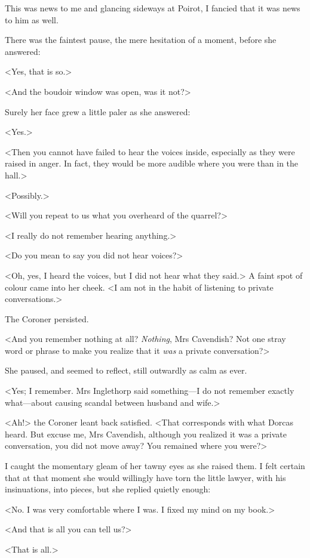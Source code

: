  This was news to me and glancing sideways at Poirot, I fancied that it was news to him as well. 

 There was the faintest pause, the mere hesitation of a moment, before she answered: 

 <Yes, that is so.> 

 <And the boudoir window was open, was it not?> 

 Surely her face grew a little paler as she answered: 

 <Yes.> 

 <Then you cannot have failed to hear the voices inside, especially as they were raised in anger. In fact, they would be more audible where you were than in the hall.> 

 <Possibly.> 

 <Will you repeat to us what you overheard of the quarrel?> 

 <I really do not remember hearing anything.> 

 <Do you mean to say you did not hear voices?> 

 <Oh, yes, I heard the voices, but I did not hear what they said.> A faint spot of colour came into her cheek. <I am not in the habit of listening to private conversations.> 

 The Coroner persisted. 

 <And you remember nothing at all? \emph{Nothing}, Mrs Cavendish? Not one stray word or phrase to make you realize that it \emph{was} a private conversation?> 

 She paused, and seemed to reflect, still outwardly as calm as ever. 

 <Yes; I remember. Mrs Inglethorp said something—I do not remember exactly what—about causing scandal between husband and wife.> 

 <Ah!> the Coroner leant back satisfied. <That corresponds with what Dorcas heard. But excuse me, Mrs Cavendish, although you realized it was a private conversation, you did not move away? You remained where you were?> 

 I caught the momentary gleam of her tawny eyes as she raised them. I felt certain that at that moment she would willingly have torn the little lawyer, with his insinuations, into pieces, but she replied quietly enough: 

 <No. I was very comfortable where I was. I fixed my mind on my book.> 

 <And that is all you can tell us?> 

 <That is all.> 

